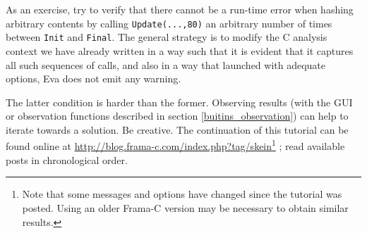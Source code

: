 \documentclass[web]{frama-c-book}
\newcommand{\Eva}{\textsf{Eva}}
\begin{document}
As an exercise, try to verify that there cannot be a run-time error
when hashing arbitrary contents by
calling \lstinline|Update(...,80)| an arbitrary number of times
between \lstinline|Init| and \lstinline|Final|.  The general strategy
is to modify the C analysis context we have already written in a way
such that it is evident that it captures all such sequences of calls,
and also in a way that launched with adequate options, 
\Eva{} does not emit any warning.

The latter condition is harder than the former.
Observing results (with the GUI or observation functions
described in section \ref{buitins_observation}) can help to iterate towards
a solution. Be creative. The continuation of this tutorial can be found online
at \url{http://blog.frama-c.com/index.php?tag/skein}\footnote{Note that some
  messages and options have changed since the tutorial was posted. Using an
  older Frama-C version may be necessary to obtain similar results.}
; read available posts in chronological order.


\end{document}
